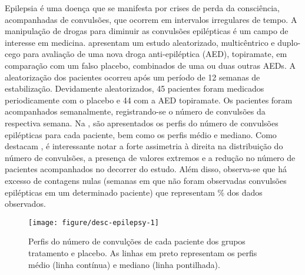 \documentclass[
    oldfontcommands,
    11pt,
    openright,
    twoside,
    a4paper,
    english,
    brazil
]{abntex2}\usepackage[]{graphicx}\usepackage[]{color}
\newenvironment{knitrout}{}{} %
\begin{document}
Epilepsia é uma doença que se manifesta por crises de perda da
consciência, acompanhadas de convulsões, que ocorrem em intervalos
irregulares de tempo. A manipulação de drogas para diminuir as
convulsões epilépticas é um campo de interesse em
medicina. \citet{Faught1996} apresentam um estudo aleatorizado,
multicêntrico e duplo-cego para avaliação de uma nova droga
anti-epiléptica (AED), topiramate, em comparação com um falso placebo,
combinados de uma ou duas outras AEDs. A aleatorização dos pacientes
ocorreu após um período de 12 semanas de estabilização. Devidamente
aleatorizados, 45 pacientes foram medicados periodicamente com o placebo
e 44 com a AED topiramate. Os pacientes foram acompanhados semanalmente,
registrando-se o número de convulsões da respectiva semana. Na
, são apresentados os perfis do número de
convulsões epilépticas para cada paciente, bem como os perfis médio e
mediano. Como destacam \citet{Molenberghs2007}, é interessante notar a
forte assimetria à direita na distribuição do número de convulsões, a
presença de valores extremos e a redução no número de pacientes
acompanhados no decorrer do estudo. Além disso, observa-se que há
excesso de contagens nulas (semanas em que não foram observadas
convulsões epilépticas em um determinado paciente) que representam
\% dos
dados observados.

\begin{knitrout}
\color{fgcolor}\begin{figure}[!htb]

{\centering \texttt{[image: figure/desc-epilepsy-1]} 

}

\caption[Perfis do número de convulções de cada paciente dos grupos tratamento e placebo]{Perfis do número de convulções de cada paciente dos grupos tratamento e placebo. As linhas em preto representam os perfis médio (linha contínua) e mediano (linha pontilhada).}\label{fig:desc-epilepsy}
\end{figure}


\end{knitrout}
\end{document}
